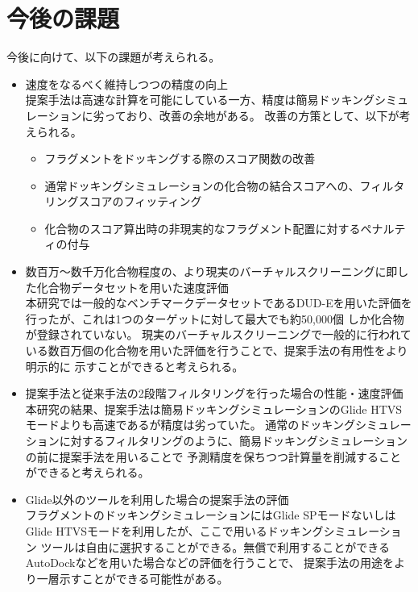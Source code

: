 \section{今後の課題}
今後に向けて、以下の課題が考えられる。
\begin{itemize}
\item 速度をなるべく維持しつつの精度の向上\\
	提案手法は高速な計算を可能にしている一方、精度は簡易ドッキングシミュレーションに劣っており、改善の余地がある。
	改善の方策として、以下が考えられる。
	\begin{itemize}
	\item フラグメントをドッキングする際のスコア関数の改善
	\item 通常ドッキングシミュレーションの化合物の結合スコアへの、フィルタリングスコアのフィッティング
	\item 化合物のスコア算出時の非現実的なフラグメント配置に対するペナルティの付与
	\end{itemize}
\item 数百万～数千万化合物程度の、より現実のバーチャルスクリーニングに即した化合物データセットを用いた速度評価\\
	本研究では一般的なベンチマークデータセットであるDUD-Eを用いた評価を行ったが、これは1つのターゲットに対して最大でも約50,000個
	しか化合物が登録されていない。
	現実のバーチャルスクリーニングで一般的に行われている数百万個の化合物を用いた評価を行うことで、提案手法の有用性をより明示的に
	示すことができると考えられる。
\item 提案手法と従来手法の2段階フィルタリングを行った場合の性能・速度評価\\
	本研究の結果、提案手法は簡易ドッキングシミュレーションのGlide HTVSモードよりも高速であるが精度は劣っていた。
	通常のドッキングシミュレーションに対するフィルタリングのように、簡易ドッキングシミュレーションの前に提案手法を用いることで
	予測精度を保ちつつ計算量を削減することができると考えられる。
\item Glide以外のツールを利用した場合の提案手法の評価\\
	フラグメントのドッキングシミュレーションにはGlide SPモードないしはGlide HTVSモードを利用したが、ここで用いるドッキングシミュレーション
	ツールは自由に選択することができる。無償で利用することができるAutoDockなどを用いた場合などの評価を行うことで、
	提案手法の用途をより一層示すことができる可能性がある。
\end{itemize}
